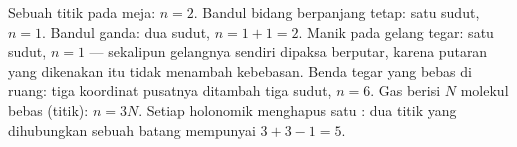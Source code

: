 \begin{example}\label{ex:b3:lagrangian-mechanics:counting}
Sebuah titik pada meja: $n = 2$. Bandul bidang berpanjang tetap: satu
sudut, $n = 1$. Bandul ganda: dua sudut, $n = 1 + 1 = 2$. Manik pada
gelang tegar: satu sudut, $n = 1$ --- sekalipun gelangnya sendiri
dipaksa berputar, karena putaran yang dikenakan itu tidak menambah
kebebasan. Benda tegar yang bebas di ruang: tiga koordinat pusatnya
ditambah tiga sudut, $n = 6$. Gas berisi $N$ molekul bebas (titik):
$n = 3N$. Setiap  holonomik menghapus satu :
dua titik yang dihubungkan sebuah batang mempunyai $3 + 3 - 1 = 5$.
\end{example}

